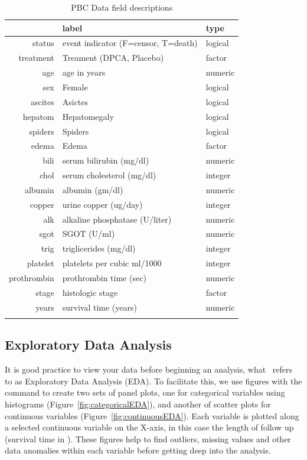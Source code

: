\documentclass[nojss]{jss}\usepackage[]{graphicx}\usepackage[]{color}
\begin{document}
\begin{table}[ht]
\centering
{\footnotesize
\begin{tabular}{rll}
  \toprule
 & label & type \\ 
  \midrule
status & event indicator (F=censor, T=death) & logical \\ 
   \rowcolor[gray]{0.95}treatment & Treament (DPCA, Placebo) & factor \\ 
  age & age in years & numeric \\ 
   \rowcolor[gray]{0.95}sex & Female & logical \\ 
  ascites & Asictes & logical \\ 
   \rowcolor[gray]{0.95}hepatom & Hepatomegaly & logical \\ 
  spiders & Spiders & logical \\ 
   \rowcolor[gray]{0.95}edema & Edema & factor \\ 
  bili & serum bilirubin (mg/dl) & numeric \\ 
   \rowcolor[gray]{0.95}chol & serum cholesterol (mg/dl) & integer \\ 
  albumin & albumin (gm/dl) & numeric \\ 
   \rowcolor[gray]{0.95}copper & urine copper (ug/day) & integer \\ 
  alk & alkaline phosphatase (U/liter) & numeric \\ 
   \rowcolor[gray]{0.95}sgot & SGOT (U/ml) & numeric \\ 
  trig & triglicerides (mg/dl) & integer \\ 
   \rowcolor[gray]{0.95}platelet & platelets per cubic ml/1000 & integer \\ 
  prothrombin & prothrombin time (sec) & numeric \\ 
   \rowcolor[gray]{0.95}stage & histologic stage & factor \\ 
  years & survival time (years) & numeric \\ 
   \rowcolor[gray]{0.95} \bottomrule
\end{tabular}
}
\caption{PBC Data field descriptions} 
\label{T:dataLabs}
\end{table}


\subsection{Exploratory Data Analysis}\label{S:eda}

It is good practice to view your data before beginning an analysis, what~\cite{Tukey:1977} refers to as Exploratory Data Analysis (EDA). To facilitate this, we use  figures with the  command to create two sets of panel plots, one for categorical variables using histograms (Figure~\ref{fig:categoricalEDA}), and another of scatter plots for continuous variables (Figure~\ref{fig:continuousEDA}). Each variable is plotted along a selected continuous variable on the X-axis, in this case the length of follow up (survival time in ). These figures help to find outliers, missing values and other data anomalies within each variable before getting deep into the analysis.
\end{document}
